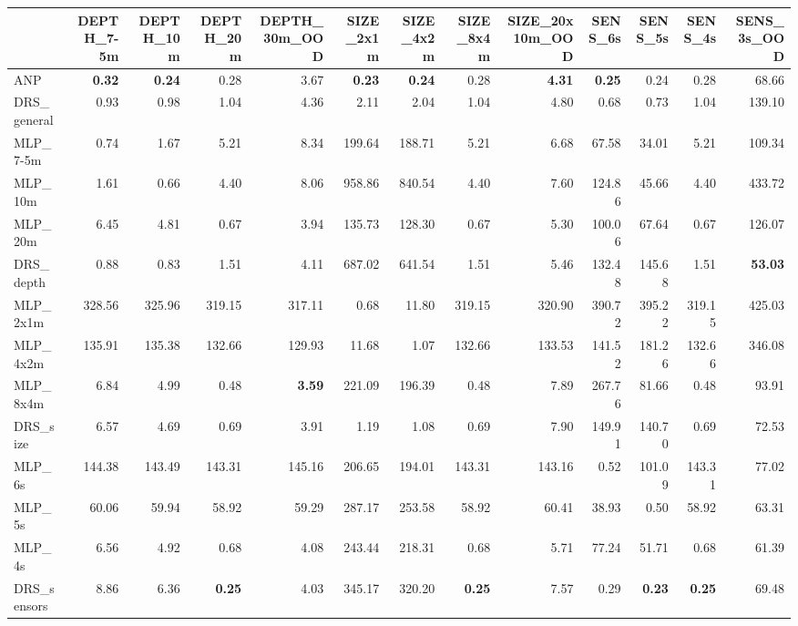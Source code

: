 \begin{tabular}{lrrrrrrrrrrrr}
\toprule
 & DEPTH_7-5m & DEPTH_10m & DEPTH_20m & DEPTH_30m_OOD & SIZE_2x1m & SIZE_4x2m & SIZE_8x4m & SIZE_20x10m_OOD & SENS_6s & SENS_5s & SENS_4s & SENS_3s_OOD \\
\midrule
ANP & \textbf{0.32} & \textbf{0.24} & 0.28 & 3.67 & \textbf{0.23} & \textbf{0.24} & 0.28 & \textbf{4.31} & \textbf{0.25} & 0.24 & 0.28 & 68.66 \\
DRS_general & 0.93 & 0.98 & 1.04 & 4.36 & 2.11 & 2.04 & 1.04 & 4.80 & 0.68 & 0.73 & 1.04 & 139.10 \\
MLP_7-5m & 0.74 & 1.67 & 5.21 & 8.34 & 199.64 & 188.71 & 5.21 & 6.68 & 67.58 & 34.01 & 5.21 & 109.34 \\
MLP_10m & 1.61 & 0.66 & 4.40 & 8.06 & 958.86 & 840.54 & 4.40 & 7.60 & 124.86 & 45.66 & 4.40 & 433.72 \\
MLP_20m & 6.45 & 4.81 & 0.67 & 3.94 & 135.73 & 128.30 & 0.67 & 5.30 & 100.06 & 67.64 & 0.67 & 126.07 \\
DRS_depth & 0.88 & 0.83 & 1.51 & 4.11 & 687.02 & 641.54 & 1.51 & 5.46 & 132.48 & 145.68 & 1.51 & \textbf{53.03} \\
MLP_2x1m & 328.56 & 325.96 & 319.15 & 317.11 & 0.68 & 11.80 & 319.15 & 320.90 & 390.72 & 395.22 & 319.15 & 425.03 \\
MLP_4x2m & 135.91 & 135.38 & 132.66 & 129.93 & 11.68 & 1.07 & 132.66 & 133.53 & 141.52 & 181.26 & 132.66 & 346.08 \\
MLP_8x4m & 6.84 & 4.99 & 0.48 & \textbf{3.59} & 221.09 & 196.39 & 0.48 & 7.89 & 267.76 & 81.66 & 0.48 & 93.91 \\
DRS_size & 6.57 & 4.69 & 0.69 & 3.91 & 1.19 & 1.08 & 0.69 & 7.90 & 149.91 & 140.70 & 0.69 & 72.53 \\
MLP_6s & 144.38 & 143.49 & 143.31 & 145.16 & 206.65 & 194.01 & 143.31 & 143.16 & 0.52 & 101.09 & 143.31 & 77.02 \\
MLP_5s & 60.06 & 59.94 & 58.92 & 59.29 & 287.17 & 253.58 & 58.92 & 60.41 & 38.93 & 0.50 & 58.92 & 63.31 \\
MLP_4s & 6.56 & 4.92 & 0.68 & 4.08 & 243.44 & 218.31 & 0.68 & 5.71 & 77.24 & 51.71 & 0.68 & 61.39 \\
DRS_sensors & 8.86 & 6.36 & \textbf{0.25} & 4.03 & 345.17 & 320.20 & \textbf{0.25} & 7.57 & 0.29 & \textbf{0.23} & \textbf{0.25} & 69.48 \\
\bottomrule
\end{tabular}
